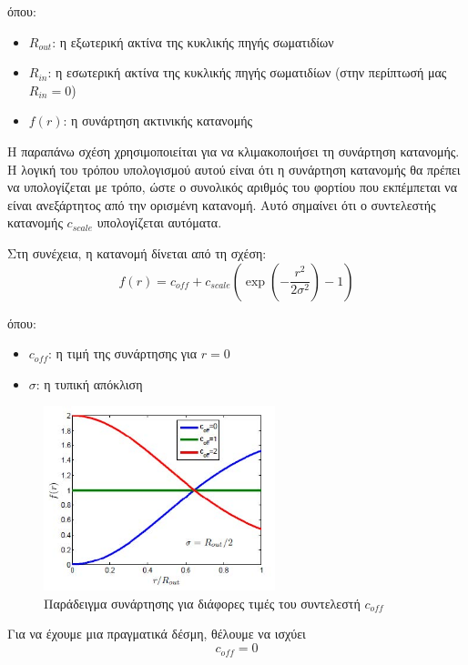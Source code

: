 όπου:
\begin{itemize}
\item $R_{out}$: η εξωτερική ακτίνα της κυκλικής πηγής σωματιδίων
\item $R_{in}$: η εσωτερική ακτίνα της κυκλικής πηγής σωματιδίων (στην περίπτωσή μας $R_{in} = 0$)
\item $f(r)$: η συνάρτηση ακτινικής κατανομής 
\end{itemize} 

Η παραπάνω σχέση χρησιμοποιείται για να κλιμακοποιήσει τη συνάρτηση κατανομής. 
Η λογική του τρόπου υπολογισμού αυτού είναι ότι η συνάρτηση κατανομής θα πρέπει να υπολογίζεται με τρόπο, ώστε ο συνολικός αριθμός του φορτίου που εκπέμπεται να είναι ανεξάρτητος από την ορισμένη κατανομή.
Αυτό σημαίνει ότι ο συντελεστής κατανομής $c_{scale}$ υπολογίζεται αυτόματα.

Στη συνέχεια, η  κατανομή δίνεται από τη σχέση:
\begin{equation}
f(r) = c_{off} + c_{scale} \left( \exp \left(-\frac{r^2}{2\sigma^2}\right) - 1 \right)
\end{equation}

όπου:
\begin{itemize}
\item $c_{off}$: η τιμή της συνάρτησης για $r = 0$
\item $\sigma$: η τυπική απόκλιση
\end{itemize} 

\begin{figure}[tph]
\includegraphics[width=0.6\textwidth]{figures/CST-gauss-function-for-coff}
\centering
\caption{Παράδειγμα  συνάρτησης για διάφορες τιμές του συντελεστή $c_{off}$}
\label{fig:CST-gauss-coff}
\end{figure}

Για να έχουμε μια πραγματικά  δέσμη, θέλουμε να ισχύει
\[c_{off} = 0\]

